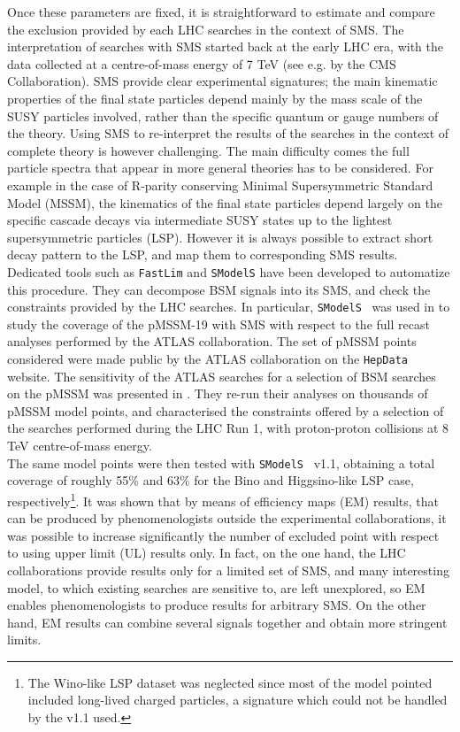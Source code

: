 \documentclass[a4paper,11pt]{article}
\newcommand{\SMO}{\texttt{SModelS\xspace}}
\newcommand{\FASTLIM}{\texttt{FastLim}}
\begin{document}
 Once these parameters are fixed, it is straightforward to estimate and compare the exclusion provided by each LHC searches in the context of SMS. The interpretation of searches with SMS started back at the early LHC era, with the data collected at a centre-of-mass energy of 7 TeV (see e.g. \cite{Chatrchyan:2013sza} by the CMS Collaboration). SMS provide clear experimental signatures; the main kinematic properties of the final state particles depend mainly by the mass scale of the SUSY particles involved, rather than the specific quantum or gauge numbers of the theory. Using SMS to re-interpret the results  of  the searches in the context of complete theory is however challenging. The main difficulty comes the full particle spectra that appear in more general theories has to be considered. For example in the case of R-parity conserving Minimal Supersymmetric Standard Model (MSSM), the kinematics of the final state particles depend largely on the specific cascade decays via intermediate SUSY states up to the lightest supersymmetric particles (LSP). However it is always possible to extract short decay pattern to the LSP, and map them to corresponding SMS results. Dedicated tools such as \FASTLIM \cite{Papucci:2014rja} and \SMO \cite{Kraml:2014sna} have been developed to automatize this procedure. They can decompose BSM signals into its SMS, and check the constraints provided by the LHC searches. In particular, \SMO~ was used in \cite{Ambrogi:2017lov} to study the coverage of the pMSSM-19\cite{Djouadi:1998di} with SMS with respect to the full recast analyses performed by the ATLAS collaboration. The set of pMSSM points considered were made public by the ATLAS collaboration on the \texttt{HepData} website\cite{ATLASpMSSMhepdata}. The sensitivity of the ATLAS searches for a selection of BSM searches on the pMSSM was presented in \cite{Aad:2015baa}. They re-run their analyses on thousands of pMSSM model points, and characterised the constraints offered by a selection of the searches performed during the LHC Run 1, with proton-proton collisions at 8 TeV centre-of-mass energy.
%
\\
The same model points were then tested with \SMO~ v1.1\cite{Ambrogi:2017neo}, obtaining a total coverage of roughly 55$\%$ and 63$\%$ for the Bino and Higgsino-like LSP case, respectively\footnote{The Wino-like LSP dataset was neglected since most of the model pointed included long-lived charged particles, a signature which could not be handled by the v1.1 used.}. It was shown that by means of efficiency maps (EM) results, that can be produced by phenomenologists outside the experimental collaborations, it was possible to increase significantly the number of excluded point with respect to using upper limit (UL) results only. In fact, on the one hand, the LHC collaborations provide results only for a limited set of SMS, and many interesting model, to which existing searches are sensitive to, are left unexplored, so EM enables phenomenologists to produce results for arbitrary SMS. On the other hand, EM results can combine several signals together and obtain more stringent limits.  
\end{document}
